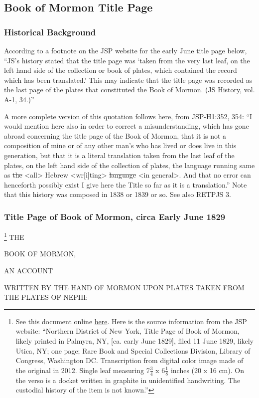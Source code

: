 \subsection{Book of Mormon Title Page}
	\label{BOMTITLE}
	
	\subsubsection{Historical Background}
	
		According to a footnote on the JSP website for the early June title page below, ``JS's history stated that the title page was `taken from the very last leaf, on the left hand side of the collection or book of plates, which contained the record which has been translated.' This may indicate that the title page was recorded as the last page of the plates that constituted the Book of Mormon. (JS History, vol. A-1, 34.)''
		
		A more complete version of this quotation follows here, from JSP-H1:352, 354: ``I would mention here also in order to correct a misunderstanding, which has gone abroad concerning the title page of the Book of Mormon, that it is not a composition of mine or of any other man's who has lived or does live in this generation, but that it is a literal translation taken from the last leaf of the plates, on the left hand side of the collection of plates, the language running same as \sout{the} <all> Hebrew <wr[i]ting> \sout{language} <in general>. And that no error can henceforth possibly exist I give here the Title so far as it is a translation.'' Note that this history was composed in 1838 or 1839 or so. See also RETPJS 3.
	
	\subsubsection{Title Page of Book of Mormon, circa Early June 1829}
		
		\begin{tightcenter}
		
				\footnote{%
					See this document online \href{www.josephsmithpapers.org/paper-summary/title-page-of-book-of-mormon-circa-early-june-1829/1}{here}. Here is the source information from the JSP website: ``Northern District of New York, Title Page of Book of Mormon, likely printed in Palmyra, NY, [ca. early June 1829], filed 11 June 1829, likely Utica, NY; one page; Rare Book and Special Collections Division, Library of Congress, Washington DC. Transcription from digital color image made of the original in 2012. Single leaf measuring 7$\frac{3}{4}$ x 6$\frac{1}{8}$ inches (20 x 16 cm). On the verso is a docket written in graphite in unidentified handwriting. The custodial history of the item is not known.''
					}%
			THE
		
			BOOK OF MORMON,
			
			AN ACCOUNT

			WRITTEN BY THE HAND OF MORMON UPON PLATES TAKEN FROM THE PLATES OF NEPHI:
		
		\end{tightcenter}

